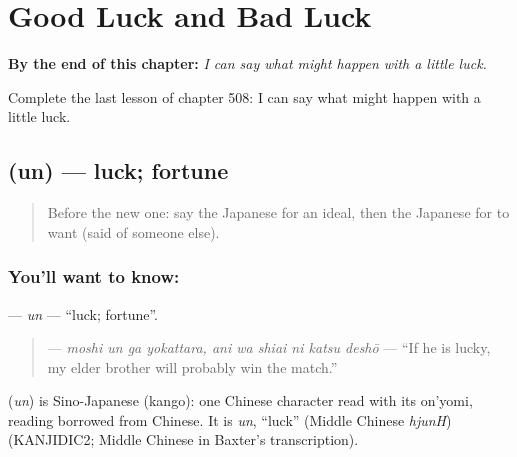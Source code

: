 
\chapter{Good Luck and Bad Luck}
\label{ch:ja-good-luck-and-bad-luck}

\begin{chapteropening}
\textbf{By the end of this chapter:} \emph{I can say what might happen with a little luck.}

Complete the last lesson of chapter 508: I can say what might happen with a little luck.
\end{chapteropening}

\section[\texorpdfstring{\ja{うん} (un)}{うん (un)}]{ (un) — luck; fortune}

\label{lesson:JA-C508-un}



\begin{quote}
Before the new one: say the Japanese for an ideal, then the Japanese for to want (said of someone else).
\end{quote}

\subsection*{You'll want to know: }
\textbf{} — \emph{un} — \textquotedblleft{}luck; fortune\textquotedblright{}.

\begin{quote}
\textbf{    } — \emph{moshi un ga yokattara, ani wa shiai ni katsu deshō} — \textquotedblleft{}If he is lucky, my elder brother will probably win the match.\textquotedblright{}
\end{quote}

\begin{cousinweb}
\textbf{} (\emph{un}) is Sino-Japanese (kango): one Chinese character read with its on'yomi, reading borrowed from Chinese. It is \emph{un}, \textquotedblleft{}luck\textquotedblright{} (Middle Chinese \emph{hjunH}) (KANJIDIC2; Middle Chinese in Baxter's transcription).
\end{cousinweb}

